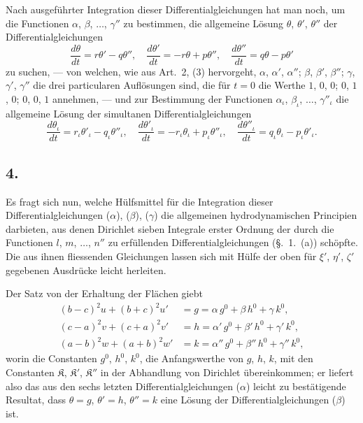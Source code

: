\documentclass[12pt,a4paper]{book}
\theoremstyle{definition}
\theoremstyle{remark}
\begin{document}
Nach ausgeführter Integration dieser Differentialgleichungen hat man noch, um die Functionen $\alpha$, $\beta$, $\ldots$, $\gamma''$ zu bestimmen, die allgemeine Lösung $\theta$, $\theta'$, $\theta''$ der Differentialgleichungen
\begin{equation}
\tag{$\beta$}
\frac{d\theta}{dt} = r\theta' - q\theta'',\quad \frac{d\theta'}{dt} = -r\theta + p\theta'',\quad \frac{d\theta''}{dt} = q\theta - p\theta'
\end{equation}
zu suchen, --- von welchen, wie aus Art.~2, (3) hervorgeht, $\alpha$, $\alpha'$, $\alpha''$; $\beta$, $\beta'$, $\beta''$; $\gamma$, $\gamma'$, $\gamma''$ die drei particularen Auflösungen sind, die für $t=0$ die Werthe $1$, $0$, $0$; $0$, $1$, $0$; $0$, $0$, $1$ annehmen, --- und zur Bestimmung der Functionen $\alpha_\iota$, $\beta_\iota$, $\ldots$, $\gamma''_{\iota}$ die allgemeine Lösung der simultanen Differentialgleichungen
\begin{equation}
\tag{$\gamma$}
\frac{d\theta_\iota}{dt} = r_\iota\theta'_\iota - q_\iota\theta''_{\iota},\quad \frac{d\theta'_\iota}{dt} = -r_\iota\theta_\iota + p_\iota\theta''_{\iota},\quad \frac{d\theta''_{\iota}}{dt} = q_\iota\theta_\iota - p_\iota\theta'_\iota.
\end{equation}

\subsection*{4.}

Es fragt sich nun, welche Hülfsmittel für die Integration dieser Differentialgleichungen ($\alpha$), ($\beta$), ($\gamma$) die allgemeinen hydrodynamischen Principien darbieten, aus denen Dirichlet sieben Integrale erster Ordnung der durch die Functionen $l$, $m$, $\ldots$, $n''$ zu erfüllenden Differentialgleichungen (\S.~1.~(a)) schöpfte. Die aus ihnen fliessenden Gleichungen lassen sich mit Hülfe der oben für $\xi'$, $\eta'$, $\zeta'$ gegebenen Ausdrücke leicht herleiten.

Der Satz von der Erhaltung der Flächen giebt
\begin{equation}
\tag{1}
\begin{aligned}
(b-c)^2u + (b+c)^2u' &= g = \alpha\,g^0 + \beta\,h^0 + \gamma\,k^0,\\
(c-a)^2v + (c+a)^2v' &= h = \alpha'\,g^0 + \beta'\,h^0 + \gamma'\,k^0,\\
(a-b)^2w + (a+b)^2w' &= k = \alpha''\,g^0 + \beta''\,h^0 + \gamma''\,k^0,
\end{aligned}
\end{equation}
worin die Constanten $g^0$, $h^0$, $k^0$, die Anfangswerthe von $g$, $h$, $k$, mit den Constanten $\mathfrak{K}$, $\mathfrak{K}'$, $\mathfrak{K}''$ in der Abhandlung von Dirichlet übereinkommen; er liefert also das aus den sechs letzten Differentialgleichungen ($\alpha$) leicht zu bestätigende Resultat, dass $\theta = g$, $\theta' = h$, $\theta'' = k$ eine Lösung der Differentialgleichungen ($\beta$) ist.
\end{document}
